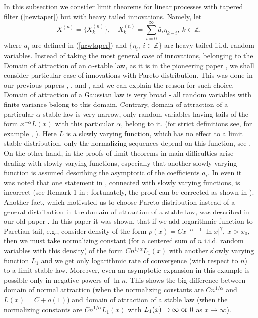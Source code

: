 \documentclass[12pt]{article}
\def\bz{{\bf Z}}
\def\bz{{\mathbb Z}} %
\def\a{\alpha}
\def\g{\gamma}
\theoremstyle{plain}
\theoremstyle{definition}
\begin{document}
In this subsection we consider limit theorems for linear processes with tapered filter (\ref{newtaper}) but with heavy tailed innovations. Namely, let
\begin{equation}\label{linpr2}
X^{(n)}=\{X_k^{(n)} \}, \quad   X_k^{(n)}=\sum_{i=0}^\infty {\bar a}_i\eta_{k-i}, \ k\in \bz,
\end{equation}
where ${\bar a}_i$ are defined in (\ref{newtaper}) and $\{\eta_i,\ i\in \bz\}$ are heavy tailed i.i.d. random variables. Instead of taking the most general case of innovations, belonging to the Domain of attraction of  an $\a$-stable law, as it is in the pioneering paper \cite{Astrauskas}, we shall consider particular case of innovations with Pareto distribution. This was done in our previous papers \cite{Paul21}, \cite{Paul22}, and \cite{PaulDam5}, and we can explain the reason for such choice.  Domain of attraction of a Gaussian law is very broad - all random variables with finite variance belong to this domain. Contrary, domain of attraction of a particular  $\a$-stable law is very narrow, only random variables having  tails  of the form $x^{-\a}L(x)$ with  this particular $\a$, belong to it. (for strict definitions see, for example , \cite{Ibragimov}). Here $L$ is a slowly varying function, which  has no effect to a limit stable distribution, only the normalizing sequences depend on this function, see \cite{Astrauskas}. On the other hand, in the proofs of limit theorems in \cite{Astrauskas} main difficulties arise dealing with slowly varying functions, especially that another slowly varying function is assumed describing the asymptotic of the coefficients $a_i$. In \cite{Damarackas} even it was noted that one statement in \cite{Astrauskas}, connected with slowly varying functions, is incorrect (see Remark 1 in \cite{Damarackas}; fortunately, the proof can be corrected as shown in \cite{Damarackas}). Another fact, which motivated us to choose Pareto distribution instead of a general distribution in the domain of attraction of a stable law, was described in our old paper \cite{PaulJuoz}. In this paper it was shown, that if we add logarithmic function to Paretian tail, e.g., consider density of the form $p(x)=Cx^{-\a-1}|\ln x|^\g, \ x>x_0$, then we must take normalizing constant (for a centered sum of $n$ i.i.d. random variables with this density) of  the form $Cn^{1/\a}L_1(x)$ with another slowly varying function $L_1$ and we get only logarithmic rate of convergence (with respect to $n$) to a limit stable law. Moreover, even an asymptotic expansion in this example is possible only in negative  powers of $\ln n$. This shows the big difference between domain of normal attraction (when the normalizing constants are $Cn^{1/\a}$ and  $L(x)=C+o(1)$) and  domain of attraction of a stable law (when the normalizing constants are $Cn^{1/\a}L_1(x)$ with $L_1(x)\to \infty\ {\rm or} \ 0$ as $x\to \infty$). %
\end{document}
